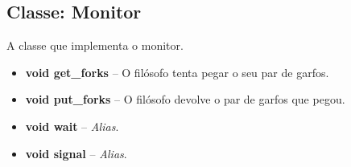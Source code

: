 \documentclass[11pt]{article}
\begin{document}
\subsection{Classe: Monitor}
A classe que implementa o monitor. 
\begin{itemize}
	\item \textbf{\textcolor{sblue}{void} get\_forks} -- O filósofo tenta pegar o seu par de garfos.
	\item \textbf{\textcolor{sblue}{void} put\_forks} -- O filósofo devolve o par de garfos que pegou.
	\item \textbf{\textcolor{sblue}{void} wait} -- \textit{Alias}.
	\item \textbf{\textcolor{sblue}{void} signal} -- \textit{Alias}.
\end{itemize}
\end{document}
